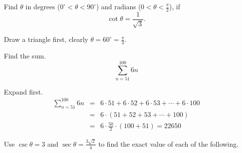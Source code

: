 \documentclass[12pt,addpoints, answers, fleqn]{exam}
\begin{document}
\begin{questions}
\question Find $\theta$ in degrees ($0^\circ < \theta < 90^\circ $) and radians ($0 < \theta < \displaystyle \frac{\pi}{2}$), if
\[
\cot \theta = \frac{1}{\sqrt{3}}.
\]
\begin{solution}
Draw a triangle first, clearly $\theta = \boxed{60^\circ = \frac{\pi}{3}}$.
\end{solution}
\question Find the sum.
\[
\sum\limits_{n = 51}^{100} 6n
\]
\begin{solution}
Expand first.
\begin{eqnarray*}
\sum\limits_{n = 51}^{100} 6n &=& 6 \cdot 51 + 6 \cdot 52 + 6 \cdot 53 + \cdots + 6 \cdot 100\\
&=& 6 \cdot \left( 51 +  52 +  53 + \cdots +  100 \right)\\
&=& 6 \cdot \frac{50}{2} \cdot \left(100 + 51 \right) = \boxed{22650}
\end{eqnarray*}
\end{solution}

\question Use $\csc \theta = 3$ and $\sec \theta = \displaystyle \frac{3\sqrt{2}}{4}$ to find the exact value of each of the following.
\end{questions}
\end{document}
